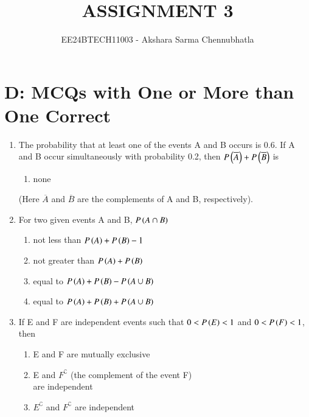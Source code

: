 \documentclass[journal,12pt,onecolumn,article]{IEEEtran}
\theoremstyle{remark}
\begin{document}

\vspace{3cm}
\title{ASSIGNMENT 3}
\author{EE24BTECH11003 - Akshara Sarma Chennubhatla}
\maketitle
\section{D: MCQs with One or More than One Correct}
\begin{enumerate}[start=3]
\item The probability that at least one of the events A and B occurs is 0.6. If A and B occur simultaneously with probability 0.2, then $P\left(\overline{A}\right)+P\left(\overline{B}\right)$ is
\hfill{}
\begin{enumerate}
\item none
\end{enumerate}
(Here $\overline{A}$ and $\overline{B}$ are the complements of A and B, respectively).
\item For two given events A and B, $P\left(A \cap B\right)$
\hfill{}
\begin{enumerate}
\item not less than $P\left(A\right)+P\left(B\right)-1$
\item not greater than $P\left(A\right)+P\left(B\right)$
\item equal to $P\left(A\right)+P\left(B\right)-P\left(A \cup B\right)$
\item equal to $P\left(A\right)+P\left(B\right)+P\left(A \cup B\right)$
\end{enumerate}
\item If E and F are independent events such that $0<P\left(E\right)<1$ and $0<P\left(F\right)<1$, then 
\hfill{}
\begin{enumerate}
\item E and F are mutually exclusive
\item E and $F^\complement$ (the complement of the event F) \\are independent
\item $E^\complement$ and $F^\complement$ are independent

\end{enumerate}
\end{enumerate}
\end{document}
